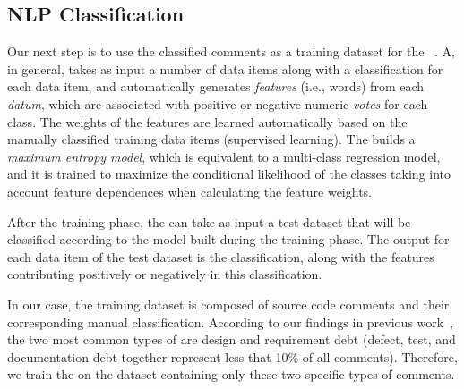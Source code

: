 
\subsection{NLP Classification}
\label{sub:run_the_nlp_classifier}

Our next step is to use the classified \SATD comments as a training dataset for the ~\cite{Manning2014ACL}. A, in general, takes as input a number of data items along with a classification for each data item, and automatically generates \textit{features} (i.e., words) from each \textit{datum}, which are associated with positive or negative numeric \textit{votes} for each class. The weights of the features are learned automatically based on the manually classified training data items (supervised learning). The  builds a \textit{maximum entropy model}, which is equivalent to a multi-class regression model, and it is trained to maximize the conditional likelihood of the classes taking into account feature dependences when calculating the feature weights.

After the training phase, the  can take as input a test dataset that will be classified according to the model built during the training phase. The output for each data item of the test dataset is the classification, along with the features contributing positively or negatively in this classification.

In our case, the training dataset is composed of source code comments and their corresponding manual classification.
According to our findings in previous work~\cite{Maldonado2015MTD}, the two most common types of \SATD are design and requirement debt (defect, test, and documentation debt together represent less that 10\% of all \SATD comments).
Therefore, we train the on the dataset containing only these two specific types of \SATD comments.

